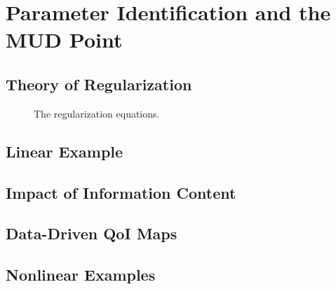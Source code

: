 \section{Parameter Identification and the MUD Point}

\subsection{Theory of Regularization}


\begin{frame}[t]
\centering
\begin{figure}
\centering

The regularization equations.

\end{figure}

\end{frame}


\subsection{Linear Example}

\subsection{Impact of Information Content}

\subsection{Data-Driven QoI Maps}

\subsection{Nonlinear Examples}
